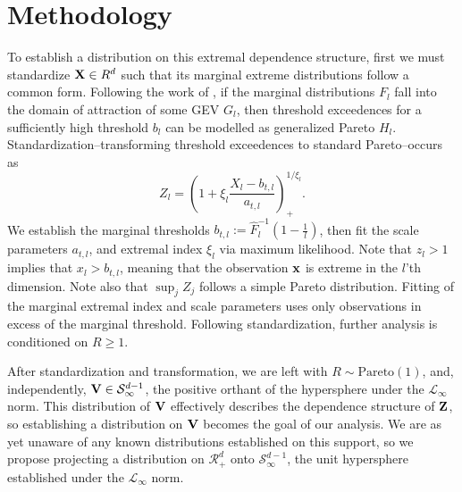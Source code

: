 \section{Methodology}
To establish a distribution on this extremal dependence structure, first we must standardize ${\bf X} \in R^d$
  such that its marginal extreme distributions follow a common form.  Following the work of
  \cite{ferreira2014}, if the marginal distributions $F_{l}$ fall into the domain
  of attraction of some GEV $G_l$, then threshold exceedences for a sufficiently high threshold $b_{l}$
  can be modelled as generalized Pareto $H_l$.  Standardization--transforming threshold exceedences to
  standard Pareto--occurs as
  \begin{equation}
    Z_l = \left(1 + \xi_l\frac{X_l - b_{t,l}}{a_{t,l}}\right)_{+}^{1/\xi_l}.
  \end{equation}
  We establish the marginal thresholds $b_{t,l} := \hat{F}_l^{-1}\left(1 - \frac{1}{l}\right)$,
  then fit the scale parameters $a_{t,l}$, and extremal index $\xi_l$ via maximum likelihood.
  Note that $z_l > 1$ implies that $x_l > b_{t,l}$, meaning that the observation ${\bf x}$ is
  extreme in the $l$'th dimension.  Note also that $\sup_j Z_j$ follows a simple Pareto distribution.
  Fitting of the marginal extremal index and scale parameters uses only observations in excess of the
  marginal threshold. Following standardization, further analysis is conditioned on $R \geq 1$.

After standardization and transformation, we are left with $R\sim\text{Pareto}(1)$, and, independently,
  ${\bf V}\in\mathcal{S}_{\infty}^{d-1}$, the positive orthant of the hypersphere under the
  $\mathcal{L}_{\infty}$ norm.  This distribution of ${\bf V}$ effectively describes the dependence
  structure of ${\bf Z}$, so establishing a distribution on ${\bf V}$ becomes the goal of our analysis.
  We are as yet unaware of any known distributions established on this support, so we propose projecting
  a distribution on $\mathcal{R}_{+}^{d}$ onto $\mathcal{S}_{\infty}^{d-1}$, the unit hypersphere
  established under the $\mathcal{L}_{\infty}$ norm.







% 



